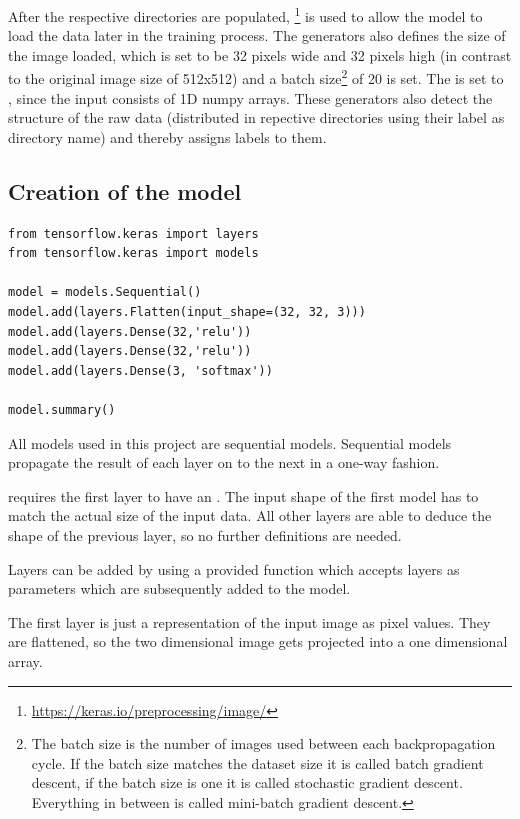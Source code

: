 After the respective directories are populated, \footnote{\url{https://keras.io/preprocessing/image/}} is used to allow the model to load the data later in the training process.
The generators also defines the size of the image loaded, which is set to be 32 pixels wide and 32 pixels high (in contrast to the original image size of 512x512) and a batch size\footnote{The batch size is the number of images used between each backpropagation cycle.
If the batch size matches the dataset size it is called batch gradient descent, if the batch size is one it is called stochastic gradient descent.
Everything in between is called mini-batch gradient descent.} of 20 is set.
The  is set to , since the input consists of 1D numpy arrays.
These generators also detect the structure of the raw data (distributed in repective directories using their label as directory name) and thereby assigns labels to them.

\subsection{Creation of the model}

\begin{lstlisting}[label={lst:first_model}]
from tensorflow.keras import layers
from tensorflow.keras import models

model = models.Sequential()
model.add(layers.Flatten(input_shape=(32, 32, 3)))
model.add(layers.Dense(32,'relu'))
model.add(layers.Dense(32,'relu'))
model.add(layers.Dense(3, 'softmax'))

model.summary()
\end{lstlisting}

All models used in this project are sequential models.
Sequential models propagate the result of each layer on to the next in a one-way fashion.

 requires the first layer to have an .
The input shape of the first model has to match the actual size of the input data.
All other layers are able to deduce the shape of the previous layer, so no further definitions are needed.

Layers can be added by using a provided  function which accepts layers as parameters which are subsequently added to the model.

The first layer is just a representation of the input image as pixel values.
They are flattened, so the two dimensional image gets projected into a one dimensional array.

